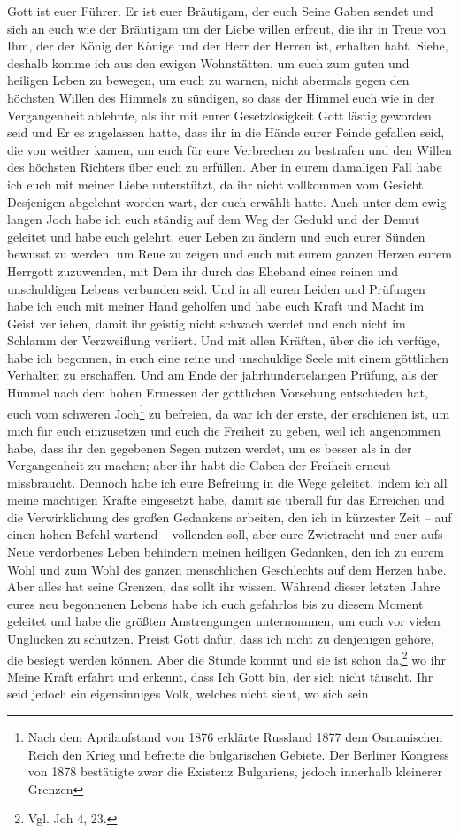 Gott ist euer Führer. Er ist euer Bräutigam, der euch Seine Gaben sendet und sich an euch wie der Bräutigam um der Liebe willen erfreut, die ihr in Treue von Ihm, der der König der Könige und der Herr der Herren ist, erhalten habt. Siehe, deshalb komme ich aus den ewigen Wohnstätten, um euch zum guten und heiligen Leben zu bewegen, um euch zu warnen, nicht abermals gegen den höchsten Willen des Himmels zu sündigen, so dass der Himmel euch wie in der Vergangenheit ablehnte, als ihr mit eurer Gesetzlosigkeit Gott lästig geworden seid und Er es zugelassen hatte, dass ihr in die Hände eurer Feinde gefallen seid, die von weither kamen, um euch für eure Verbrechen zu bestrafen und den Willen des höchsten Richters über euch zu erfüllen. Aber in eurem damaligen Fall habe ich euch mit meiner Liebe unterstützt, da ihr nicht vollkommen vom Gesicht Desjenigen abgelehnt worden wart, der euch erwählt hatte. Auch unter dem ewig langen Joch habe ich euch ständig auf dem Weg der Geduld und der Demut geleitet und habe euch gelehrt, euer Leben zu ändern und euch eurer Sünden bewusst zu werden, um Reue zu zeigen und euch mit eurem ganzen Herzen eurem Herrgott zuzuwenden, mit Dem ihr durch das Eheband eines reinen und unschuldigen Lebens verbunden seid. Und in all euren Leiden und Prüfungen habe ich euch mit meiner Hand geholfen und habe euch Kraft und Macht im Geist verliehen, damit ihr geistig nicht schwach werdet und euch nicht im Schlamm der Verzweiflung verliert. Und mit allen Kräften, über die ich verfüge, habe ich begonnen, in euch eine reine und unschuldige Seele mit einem göttlichen Verhalten zu erschaffen. Und am Ende der jahrhundertelangen Prüfung, als der Himmel nach dem hohen Ermessen der göttlichen Vorsehung entschieden hat, euch vom schweren Joch\footnote{Nach dem Aprilaufstand von 1876 erklärte Russland 1877 dem Osmanischen Reich den Krieg und befreite die bulgarischen Gebiete. Der Berliner Kongress von 1878 bestätigte zwar die Existenz Bulgariens, jedoch innerhalb kleinerer Grenzen} zu befreien, da war ich der erste, der erschienen ist, um mich für euch einzusetzen und euch die Freiheit zu geben, weil ich angenommen habe, dass ihr den gegebenen Segen nutzen werdet, um es besser als in der Vergangenheit zu machen; aber ihr habt die Gaben der Freiheit erneut missbraucht. Dennoch habe ich eure Befreiung in die Wege geleitet, indem ich all meine mächtigen Kräfte eingesetzt habe, damit sie überall für das Erreichen und die Verwirklichung des großen Gedankens arbeiten, den ich in kürzester Zeit -- auf einen hohen Befehl wartend -- vollenden soll, aber eure Zwietracht und euer aufs Neue verdorbenes Leben behindern meinen heiligen Gedanken, den ich zu eurem Wohl und zum Wohl des ganzen menschlichen Geschlechts auf dem Herzen habe. Aber alles hat seine Grenzen, das sollt ihr wissen. Während dieser letzten Jahre eures neu begonnenen Lebens habe ich euch gefahrlos bis zu diesem Moment geleitet und habe die größten Anstrengungen unternommen, um euch vor vielen Unglücken zu schützen. Preist Gott dafür, dass ich nicht zu denjenigen gehöre, die besiegt werden können. Aber die Stunde kommt und sie ist schon da,\footnote{Vgl. Joh 4, 23.} wo ihr Meine Kraft erfahrt und erkennt, dass Ich Gott bin, der sich nicht täuscht. Ihr seid jedoch ein eigensinniges Volk, welches nicht sieht, wo sich sein 